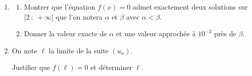 \documentclass[10pt]{article}
\begin{document}
	\begin{enumerate}
		\item \begin{enumerate}
			\item Montrer que l'équation $f(x)=0$ admet exactement deux solutions sur \linebreak $[2 ~;~+\infty[$ que l'on notera $\alpha$ et $\beta$ avec $\alpha<\beta$.

			\item Donner la valeur exacte de $\alpha$ et une valeur approchée à $10^{-3}$ près de $\beta$.
		\end{enumerate}

		\item On note $\ell$ la limite de la suite $(u_{n})$.

		Justifier que $f(\ell)=0$ et déterminer $\ell$.
	\end{enumerate}
\end{document}
